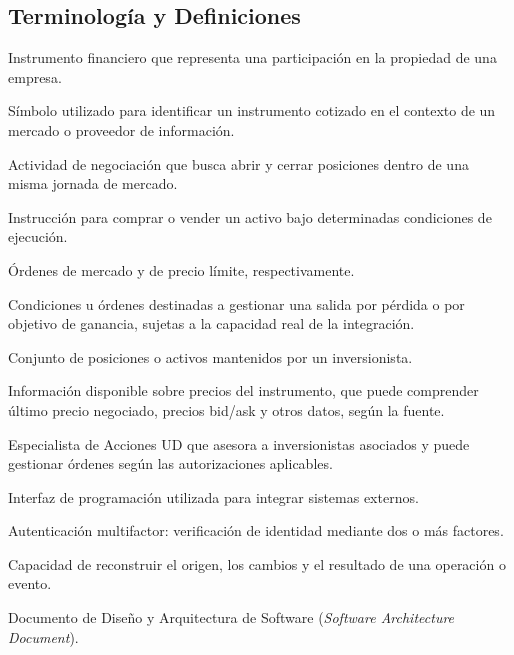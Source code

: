 \documentclass[11pt,a4paper,oneside]{article}
\begin{document}
\subsection{Terminología y Definiciones}
\begin{description}[leftmargin=3.5cm,labelwidth=3.2cm,font=\normalfont\bfseries,style=nextline]
    \item[Acción] Instrumento financiero que representa una participación en la propiedad de una empresa.
    \item[Ticker] Símbolo utilizado para identificar un instrumento cotizado en el contexto de un mercado o proveedor de información.
    \item[Day trading] Actividad de negociación que busca abrir y cerrar posiciones dentro de una misma jornada de mercado.
    \item[Orden] Instrucción para comprar o vender un activo bajo determinadas condiciones de ejecución.
    \item[Market / Limit] Órdenes de mercado y de precio límite, respectivamente.
    \item[Stop-loss / Take-profit] Condiciones u órdenes destinadas a gestionar una salida por pérdida o por objetivo de ganancia, sujetas a la capacidad real de la integración.
    \item[Portafolio] Conjunto de posiciones o activos mantenidos por un inversionista.
    \item[Cotización] Información disponible sobre precios del instrumento, que puede comprender último precio negociado, precios bid/ask y otros datos, según la fuente.
    \item[Comisionista] Especialista de Acciones UD que asesora a inversionistas asociados y puede gestionar órdenes según las autorizaciones aplicables.
    \item[API] Interfaz de programación utilizada para integrar sistemas externos.
    \item[MFA] Autenticación multifactor: verificación de identidad mediante dos o más factores.
    \item[Trazabilidad] Capacidad de reconstruir el origen, los cambios y el resultado de una operación o evento.
    \item[SAD] Documento de Diseño y Arquitectura de Software (\emph{Software Architecture Document}).
\end{description}

\end{document}
